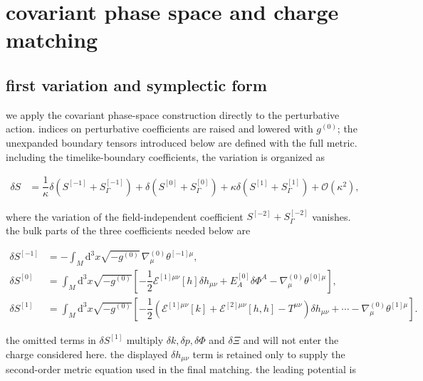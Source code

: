 \section{covariant phase space and charge matching}\label{sec:covariant-phase-space-charge-matching}

\subsection{first variation and symplectic form}

we apply the covariant phase-space construction directly to the perturbative action. indices on perturbative coefficients are raised and lowered with $\displaystyle{g^{(0)}}$; the unexpanded boundary tensors introduced below are defined with the full metric. including the timelike-boundary coefficients, the variation is organized as

\begin{align}
\delta S & =\dfrac{1}{\kappa}\delta\left(S^{[-1]}+S_{\Gamma}^{[-1]}\right)+\delta\left(S^{[0]}+S_{\Gamma}^{[0]}\right)+\kappa\delta\left(S^{[1]}+S_{\Gamma}^{[1]}\right)+\mathcal{O}(\kappa ^{2}),
\end{align}

where the variation of the field-independent coefficient $\displaystyle{S^{[-2]}+S_{\Gamma}^{[-2]}}$ vanishes. the bulk parts of the three coefficients needed below are

\[\begin{aligned}
\delta S^{[-1]} & =-\int _{M}\mathrm{d}^{3}x\sqrt{-g^{(0)}}\,\nabla ^{(0)}_{\mu}\theta ^{[-1]\mu}, \\
\delta S^{[0]} & =\int _{M}\mathrm{d}^{3}x\sqrt{-g^{(0)}}\left[-\dfrac{1}{2}\mathcal{E}^{[1]\mu \nu}[h]\delta h_{\mu \nu} +E_{A}^{[0]}\delta \Phi ^{A}-\nabla ^{(0)}_{\mu}\theta ^{[0]\mu}\right], \\
\delta S^{[1]} & =\int _{M}\mathrm{d}^{3}x\sqrt{-g^{(0)}}\left[-\dfrac{1}{2}\left(\mathcal{E}^{[1]\mu \nu}[k]+\mathcal{E}^{[2]\mu \nu}[h,h]-T^{\mu \nu}\right)\delta h_{\mu \nu} +\cdots-\nabla ^{(0)}_{\mu}\theta ^{[1]\mu}\right].
\end{aligned}\]

the omitted terms in $\displaystyle{\delta S^{[1]}}$ multiply $\displaystyle{\delta k,\delta p,\delta \Phi}$ and $\displaystyle{\delta \Xi}$ and will not enter the charge considered here. the displayed $\delta h_{\mu\nu}$ term is retained only to supply the second-order metric equation used in the final matching. the leading potential is

